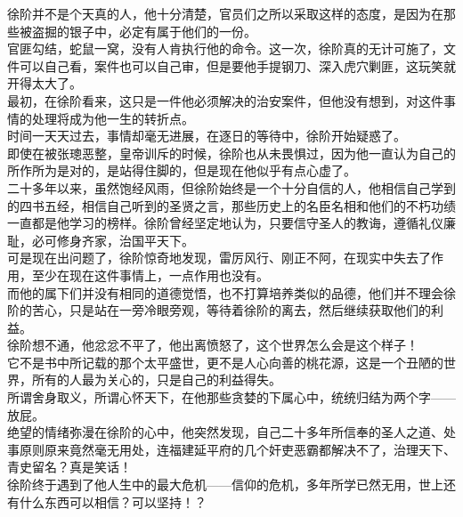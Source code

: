\begin{multicols}{\theparacolNo}
徐阶并不是个天真的人，他十分清楚，官员们之所以采取这样的态度，是因为在那些被盗掘的银子中，必定有属于他们的一份。\\

官匪勾结，蛇鼠一窝，没有人肯执行他的命令。这一次，徐阶真的无计可施了，文件可以自己看，案件也可以自己审，但是要他手提钢刀、深入虎穴剿匪，这玩笑就开得太大了。\\

最初，在徐阶看来，这只是一件他必须解决的治安案件，但他没有想到，对这件事情的处理将成为他一生的转折点。\\

时间一天天过去，事情却毫无进展，在逐日的等待中，徐阶开始疑惑了。\\

即使在被张璁恶整，皇帝训斥的时候，徐阶也从未畏惧过，因为他一直认为自己的所作所为是对的，是站得住脚的，但是现在他似乎有点心虚了。\\

二十多年以来，虽然饱经风雨，但徐阶始终是一个十分自信的人，他相信自己学到的四书五经，相信自己听到的圣贤之言，那些历史上的名臣名相和他们的不朽功绩一直都是他学习的榜样。徐阶曾经坚定地认为，只要信守圣人的教诲，遵循礼仪廉耻，必可修身齐家，治国平天下。\\

可是现在出问题了，徐阶惊奇地发现，雷厉风行、刚正不阿，在现实中失去了作用，至少在现在这件事情上，一点作用也没有。\\

而他的属下们并没有相同的道德觉悟，也不打算培养类似的品德，他们并不理会徐阶的苦心，只是站在一旁冷眼旁观，等待着徐阶的离去，然后继续获取他们的利益。\\

徐阶想不通，他忿忿不平了，他出离愤怒了，这个世界怎么会是这个样子！\\

它不是书中所记载的那个太平盛世，更不是人心向善的桃花源，这是一个丑陋的世界，所有的人最为关心的，只是自己的利益得失。\\

所谓舍身取义，所谓心怀天下，在他那些贪婪的下属心中，统统归结为两个字——放屁。\\

绝望的情绪弥漫在徐阶的心中，他突然发现，自己二十多年所信奉的圣人之道、处事原则原来竟然毫无用处，连福建延平府的几个奸吏恶霸都解决不了，治理天下、青史留名？真是笑话！\\

徐阶终于遇到了他人生中的最大危机——信仰的危机，多年所学已然无用，世上还有什么东西可以相信？可以坚持！？\\


\end{multicols}
